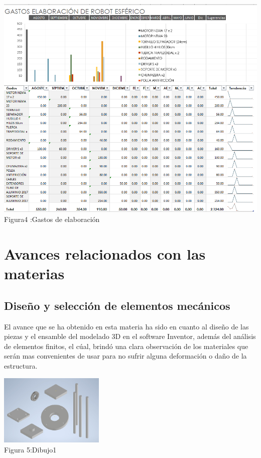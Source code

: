 \documentclass[11pt,a4paper,oldfontcommands,oneside]{memoir}
\begin{document}
\begin{center}
\includegraphics[width=16cm]{2019-10-18.png}
 Figura4 :Gastos de elaboración
\end{center}
    
\section{Avances relacionados con las materias}
\subsection{Diseño y selección de elementos mecánicos}
El avance que se ha obtenido en esta materia ha sido en cuanto al diseño de las piezas y el ensamble del modelado 3D en el software Inventor, además del análisis de elementos finitos, el cúal, brindó una clara observación de los materiales que serán mas convenientes de usar para no sufrir alguna deformación o daño de la estructura.\\

\begin{center}
\includegraphics[width=5cm]{Dibujo1.jpeg}
 \\
 Figura 5:Dibujo1
\end{center}
\end{document}
